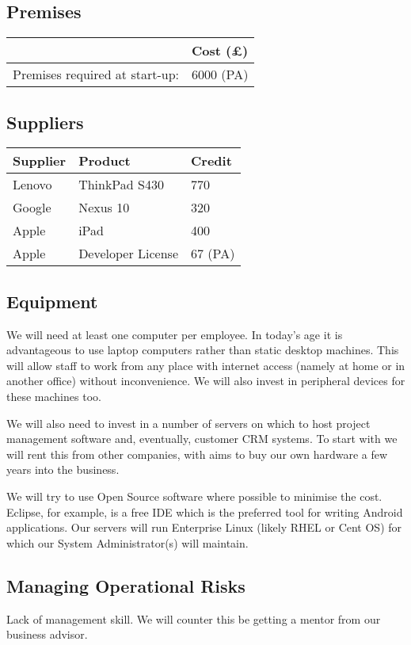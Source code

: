 \documentclass[DIV=calc, paper=a4, fontsize=11pt]{scrartcl}	 %
\begin{document}
\subsection{Premises}
\begin{tabular}{|l|l|} \hline
                               & Cost (\pounds) \\ \hline
Premises required at start-up: & 6000 (PA)      \\ \hline
\end{tabular}

\subsection{Suppliers}
\begin{tabular}{|l|l|l|} \hline
Supplier & Product       & Credit \\ \hline
Lenovo   & ThinkPad S430 & 770 \\ \hline
Google   & Nexus 10      & 320 \\ \hline
Apple    & iPad          & 400 \\ \hline
Apple    & Developer License & 67 (PA) \\ \hline
\end{tabular}

\subsection{Equipment}
We will need at least one computer per employee. In today's age it is advantageous to use laptop
computers rather than static desktop machines. This will allow staff to work from any place with
internet access (namely at home or in another office) without inconvenience. We will also invest
in peripheral devices for these machines too.

We will also need to invest in a number of servers on which to host project management software
and, eventually, customer CRM systems. To start with we will rent this from other companies, with
aims to buy our own hardware a few years into the business.

We will try to use Open Source software where possible to minimise the cost. Eclipse, for example,
is a free IDE which is the preferred tool for writing Android applications. Our servers will run
Enterprise Linux (likely RHEL or Cent OS) for which our System Administrator(s) will maintain. 

\subsection{Managing Operational Risks}
Lack of management skill. We will counter this be getting a mentor from our business advisor.
\end{document}
